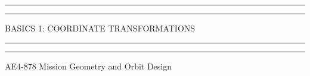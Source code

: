 \newcommand{\e}[2]{#1\cdot 10^{#2}}
\newcommand{\nd}[1]{\mathbf{#1}}
% 

 
    \begin{titlepage} %

        \centering %
        
        \scshape %
        
        \vspace*{\baselineskip} %
        
        
        \rule{\textwidth}{1.6pt}\vspace*{-\baselineskip}\vspace*{2pt} %
        \rule{\textwidth}{0.4pt} %
        
        \vspace{0.75\baselineskip} %
        
        {\LARGE BASICS 1: COORDINATE TRANSFORMATIONS} %
        
        \vspace{0.75\baselineskip} %
        
        \rule{\textwidth}{0.4pt}\vspace*{-\baselineskip}\vspace{3.2pt} %
        \rule{\textwidth}{1.6pt} %
        
        \vspace{2\baselineskip} %
        
        
        AE4-878 Mission Geometry and Orbit Design
        
        \vspace*{3\baselineskip} %
        

\end{titlepage}
